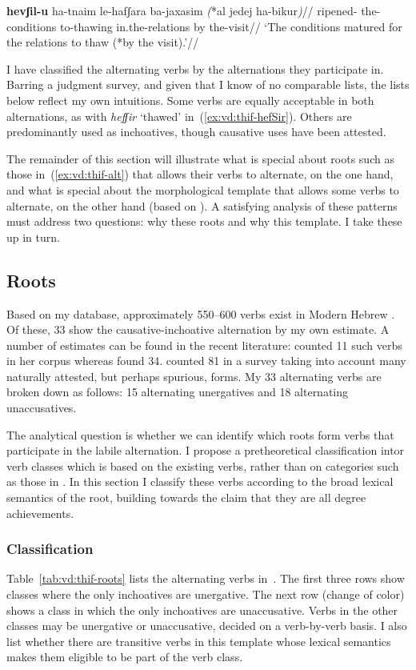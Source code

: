 	\a \begingl
		\gla \textbf{hevʃil-u} ha-tnaim le-hafʃara ba-jaxasim \emph{(}*{al jedej} ha-bikur\emph{)}//
		\glb ripened- the-conditions to-thawing in.the-relations \phantom{*(}by the-visit//
		\glft `The conditions matured for the relations to thaw (*by the visit).'//
	\endgl
\xe

I have classified the alternating verbs by the alternations they participate in. Barring a judgment survey, and given that I know of no comparable lists, the lists below reflect my own intuitions. Some verbs are equally acceptable in both alternations, as with \emph{hefʃir} `thawed' in~(\ref{ex:vd:thif-hefSir}). Others are predominantly used as inchoatives, though causative uses have been attested.

The remainder of this section will illustrate what is special about roots such as those in~(\ref{ex:vd:thif-alt}) that allows their verbs to alternate, on the one hand, and what is special about the morphological template that allows some verbs to alternate, on the other hand (based on \citealt{kastner18tlr}). A satisfying analysis of these patterns must address two questions: why these roots and why this template. I take these up in turn.

	\subsection{Roots} \label{vd:inch:roots}
Based on my database, approximately 550--600 verbs exist in Modern Hebrew {\thif}. Of these, 33 show the causative-inchoative alternation by my own estimate. A number of estimates can be found in the recent literature: \cite{arad05} counted 11 such verbs in her corpus whereas \cite{laks11} found 34. \cite{lev16} counted 81 in a survey taking into account many naturally attested, but perhaps spurious, forms. My 33 alternating verbs are broken down as follows: 15 alternating unergatives and 18 alternating unaccusatives.

The analytical question is whether we can identify which roots form verbs that participate in the labile alternation. I propose a pretheoretical classification intor verb classes which is based on the existing verbs, rather than on categories such as those in \cite{levin93}. In this section I classify these verbs according to the broad lexical semantics of the root, building towards the claim that they are all degree achievements.

	\subsubsection{Classification}
Table~\ref{tab:vd:thif-roots} lists the alternating verbs in~{\thit}. The first three rows show classes where the only inchoatives are unergative. The next row (change of color) shows a class in which the only inchoatives are unaccusative. Verbs in the other classes may be unergative or unaccusative, decided on a verb-by-verb basis. I also list whether there are transitive verbs in this template whose lexical semantics makes them eligible to be part of the verb class.

